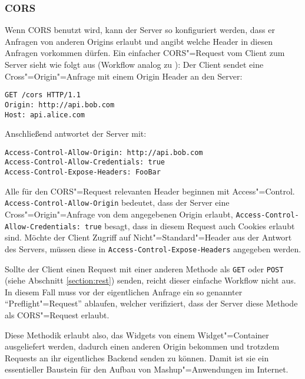 \subsubsection*{\acs{CORS}}
Wenn \acl{CORS} benutzt wird, kann der Server so konfiguriert werden, dass er Anfragen von anderen Origins erlaubt und angibt welche Header in diesen Anfragen vorkommen dürfen. Ein einfacher \ac{CORS}"=Request vom Client zum Server sieht wie folgt aus (Workflow analog zu \cite{Hossain2012}):
Der Client sendet eine Cross"=Origin"=Anfrage mit einem Origin Header an den Server:
\begin{lstlisting}
GET /cors HTTP/1.1
Origin: http://api.bob.com
Host: api.alice.com
\end{lstlisting}
Anschließend antwortet der Server mit:
\begin{lstlisting}
Access-Control-Allow-Origin: http://api.bob.com
Access-Control-Allow-Credentials: true
Access-Control-Expose-Headers: FooBar
\end{lstlisting}
Alle für den \ac{CORS}"=Request relevanten Header beginnen mit Access"=Control.\\ \texttt{Access\allowbreak -Control\allowbreak -Allow\allowbreak -Origin} bedeutet, dass der Server eine Cross"=Origin"=Anfrage von dem angegebenen Origin erlaubt, \texttt{Access\allowbreak -Control\allowbreak -Allow\allowbreak -Credentials: true} besagt, dass in diesem Request auch Cookies erlaubt sind. Möchte der Client Zugriff auf Nicht"=Standard"=Header aus der Antwort des Servers, müssen diese in \texttt{Access\allowbreak -Control\allowbreak -Expose\allowbreak -Headers} angegeben werden.

Sollte der Client einen Request mit einer anderen Methode als \texttt{GET} oder \texttt{POST} (siehe Abschnitt \ref{section:rest}) senden, reicht dieser einfache Workflow nicht aus. In diesem Fall muss vor der eigentlichen Anfrage ein so genannter "`Preflight"=Request"' ablaufen, welcher verifiziert, dass der Server diese Methode als \ac{CORS}"=Request erlaubt.

Diese Methodik erlaubt also, das Widgets von einem Widget"=Container ausgeliefert werden, dadurch einen anderen Origin bekommen und trotzdem Requests an ihr eigentliches Backend senden zu können. Damit ist sie ein essentieller Baustein für den Aufbau von Mashup"=Anwendungen im Internet.


